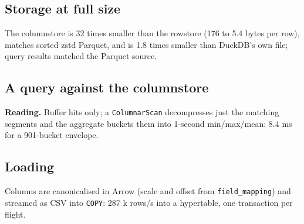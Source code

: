 \documentclass[11pt,a4paper]{article}
\newcommand{\code}[1]{\texttt{#1}}
\newcommand{\listingr}[3]{}
\newcommand{\terminalr}[3]{}
\begin{document}
\subsection{Storage at full size}
\begin{center}
\end{center}
The columnstore is 32 times smaller than the rowstore (176 to 5.4 bytes per row), matches sorted zstd Parquet, and is 1.8 times smaller than DuckDB's own file; query results matched the Parquet source.

\subsection{A query against the columnstore}
\terminalr{term-plan-envelope}{1}{24}
\textbf{Reading.} Buffer hits only; a \code{ColumnarScan} decompresses just the matching segments and the aggregate buckets them into 1-second min/max/mean: 8.4 ms for a 901-bucket envelope.

\subsection{Loading}
\listingr{code-copy}{1}{13}
Columns are canonicalised in Arrow (scale and offset from \code{field\_mapping}) and streamed as CSV into \code{COPY}: 287 k rows/s into a hypertable, one transaction per flight.

\end{document}
